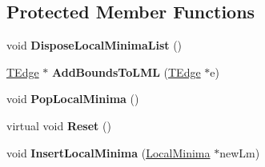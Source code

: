 \subsection*{Protected Member Functions}
\begin{DoxyCompactItemize}
\item 
\hypertarget{classClipperLib_1_1ClipperBase_a311dbbec1454ab7965e363a0359f5ee4}{void {\bfseries Dispose\-Local\-Minima\-List} ()}\label{classClipperLib_1_1ClipperBase_a311dbbec1454ab7965e363a0359f5ee4}

\item 
\hypertarget{classClipperLib_1_1ClipperBase_a2e70686545484c6767dead34d9673ebe}{\hyperlink{structClipperLib_1_1TEdge}{T\-Edge} $\ast$ {\bfseries Add\-Bounds\-To\-L\-M\-L} (\hyperlink{structClipperLib_1_1TEdge}{T\-Edge} $\ast$e)}\label{classClipperLib_1_1ClipperBase_a2e70686545484c6767dead34d9673ebe}

\item 
\hypertarget{classClipperLib_1_1ClipperBase_a9554e9f2273c39e0f5f07d3cd73533e6}{void {\bfseries Pop\-Local\-Minima} ()}\label{classClipperLib_1_1ClipperBase_a9554e9f2273c39e0f5f07d3cd73533e6}

\item 
\hypertarget{classClipperLib_1_1ClipperBase_a125febb065f23fc55dafffe8d185b642}{virtual void {\bfseries Reset} ()}\label{classClipperLib_1_1ClipperBase_a125febb065f23fc55dafffe8d185b642}

\item 
\hypertarget{classClipperLib_1_1ClipperBase_aa62506f423172bccd6de8a645cc29cff}{void {\bfseries Insert\-Local\-Minima} (\hyperlink{structClipperLib_1_1LocalMinima}{Local\-Minima} $\ast$new\-Lm)}\label{classClipperLib_1_1ClipperBase_aa62506f423172bccd6de8a645cc29cff}

\end{DoxyCompactItemize}
